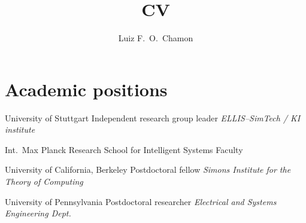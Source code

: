 \documentclass{cvlfoc}
\author[Luiz F.\ O.\ Chamon]{Luiz F.\ O.\ Chamon}
\title{CV}
\begin{document}
\maketitle
{}


%
%
%
%



\section*{Academic positions}

\begin{entrydate}
		{University of Stuttgart}
		{Independent research group leader}
		{\emph{ELLIS--SimTech / KI institute}}

		{Int.\ Max Planck Research School for Intelligent Systems}
		{Faculty}
		{}

		{University of California, Berkeley}
		{Postdoctoral fellow}
		{\emph{Simons Institute for the Theory of Computing}}

		{University of Pennsylvania}
		{Postdoctoral researcher}
		{\emph{Electrical and Systems Engineering Dept.}}
\end{entrydate}
\end{document}
